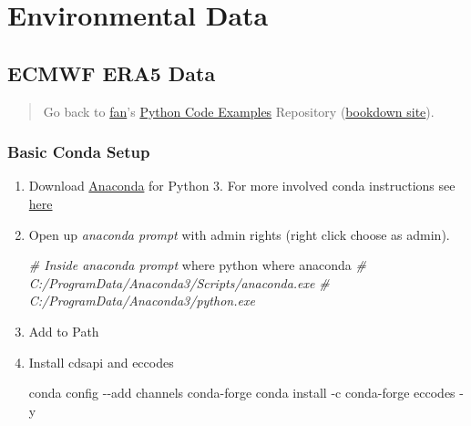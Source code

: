 \documentclass[
]{book}
\newenvironment{Shaded}{\begin{snugshade}}{\end{snugshade}}
\newcommand{\CommentTok}[1]{\textcolor[rgb]{0.56,0.35,0.01}{\textit{#1}}}
\newcommand{\ExtensionTok}[1]{#1}
\newcommand{\NormalTok}[1]{#1}
\begin{document}
\hypertarget{environmental-data}{%
\section{Environmental Data}\label{environmental-data}}

\hypertarget{ecmwf-era5-data}{%
\subsection{ECMWF ERA5 Data}\label{ecmwf-era5-data}}

\begin{quote}
Go back to \href{http://fanwangecon.github.io/}{fan}'s \href{https://fanwangecon.github.io/pyfan/}{Python Code Examples} Repository (\href{https://fanwangecon.github.io/pyfan/bookdown}{bookdown site}).
\end{quote}

\hypertarget{basic-conda-setup}{%
\subsubsection{Basic Conda Setup}\label{basic-conda-setup}}

\begin{enumerate}
\def\labelenumi{\arabic{enumi}.}
\item
  Download \href{https://www.anaconda.com/products/individual}{Anaconda} for Python 3. For more involved conda instructions see \href{https://fanwangecon.github.io/Tex4Econ/nontex/install/windows/fn_installations.html}{here}
\item
  Open up \emph{anaconda prompt} with admin rights (right click choose as admin).

\begin{Shaded}
\begin{Highlighting}[]
\CommentTok{\# Inside anaconda prompt}
\ExtensionTok{where}\NormalTok{ python}
\ExtensionTok{where}\NormalTok{ anaconda}
\CommentTok{\# C:/ProgramData/Anaconda3/Scripts/anaconda.exe}
\CommentTok{\# C:/ProgramData/Anaconda3/python.exe}
\end{Highlighting}
\end{Shaded}
\item
  Add to Path
\item
  Install cdsapi and eccodes

\begin{Shaded}
\begin{Highlighting}[]
\ExtensionTok{conda}\NormalTok{ config {-}{-}add channels conda{-}forge}
\ExtensionTok{conda}\NormalTok{ install {-}c conda{-}forge eccodes {-}y}
\end{Highlighting}
\end{Shaded}
\end{enumerate}
\end{document}
